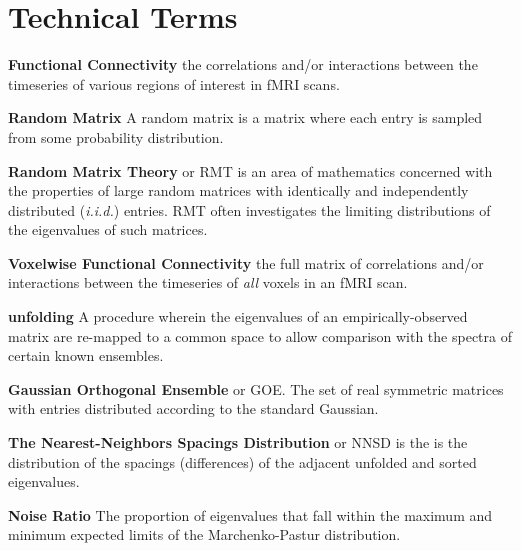 \documentclass[NETN,manuscript]{stjour-new}
\begin{document}



\section{Technical Terms}

\textbf{Functional Connectivity} the correlations and/or interactions between the timeseries of
various regions of interest in fMRI scans.

\textbf{Random Matrix} A random matrix is a matrix where each entry is sampled from some probability
distribution.

\textbf{Random Matrix Theory} or RMT is an area of mathematics concerned with the properties of
large random matrices with identically and independently distributed (\emph{i.i.d.}) entries. RMT often investigates
the limiting distributions of the eigenvalues of such matrices.

\textbf{Voxelwise Functional Connectivity} the full matrix of correlations and/or interactions
between the timeseries of \emph{all} voxels in an fMRI scan.

\textbf{unfolding} A procedure wherein the eigenvalues of an empirically-observed matrix are
re-mapped to a common space to allow comparison with the spectra of certain known ensembles.

\textbf{Gaussian Orthogonal Ensemble} or GOE. The set of real symmetric matrices with entries
distributed according to the standard Gaussian.

\textbf{The Nearest-Neighbors Spacings Distribution} or NNSD is the is the distribution of the
spacings (differences) of the adjacent unfolded and sorted eigenvalues.

\textbf{Noise Ratio} The proportion of eigenvalues that fall within the maximum and minimum expected
limits of the Marchenko-Pastur distribution.
\end{document}

